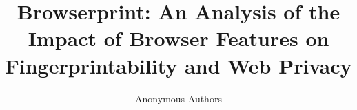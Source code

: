 \documentclass[runningheads]{llncs}
\begin{document}
\title{Browserprint: An Analysis of the Impact of Browser Features on Fingerprintability and Web Privacy}


\author{Anonymous Authors}

\UseRawInputEncoding
\maketitle











\end{document}
